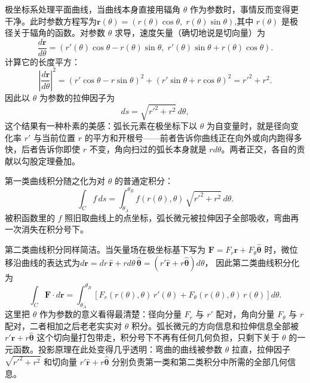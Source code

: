 \documentclass[UTF8]{ctexbook}
\begin{document}
极坐标系处理平面曲线，当曲线本身直接用辐角 $\theta$ 作为参数时，事情反而变得更干净。此时参数方程写为$\mathbf{r}(\theta) = (r(\theta)\cos\theta,\; r(\theta)\sin\theta)$,其中 $r(\theta)$ 是极径关于辐角的函数。对参数 $\theta$ 求导，速度矢量（确切地说是切向量）为
\[
\frac{d\mathbf{r}}{d\theta} = \left( r'(\theta)\cos\theta - r(\theta)\sin\theta,\; r'(\theta)\sin\theta + r(\theta)\cos\theta \right).
\]
计算它的长度平方：
\[
\left|\frac{d\mathbf{r}}{d\theta}\right|^2 = (r'\cos\theta - r\sin\theta)^2 + (r'\sin\theta + r\cos\theta)^2= r'^2 + r^2.
\]
因此以 $\theta$ 为参数的拉伸因子为
\[
ds = \sqrt{r'^2 + r^2} \, d\theta,
\]
这个结果有一种朴素的美感：弧长元素在极坐标下以 $\theta$ 为自变量时，就是径向变化率 $r'$ 与当前位置 $r$ 的平方和开根号——前者告诉你曲线正在向外或向内跑得多快，后者告诉你即使 $r$ 不变，角向扫过的弧长本身就是 $r d\theta$。两者正交，各自的贡献以勾股定理叠加。

第一类曲线积分随之化为对 $\theta$ 的普通定积分：
\[
\int_C f \, ds = \int_{\theta_A}^{\theta_B} f(r(\theta), \theta) \, \sqrt{r'^2 + r^2} \, d\theta.
\]
被积函数里的 $f$ 照旧取曲线上的点坐标，弧长微元被拉伸因子全部吸收，弯曲再一次消失在积分号下。

第二类曲线积分同样简洁。当矢量场在极坐标基下写为 $\mathbf{F} = F_r \hat{\mathbf{r}} + F_\theta \hat{\boldsymbol{\theta}}$ 时，微位移沿曲线的表达式为$d\mathbf{r} = dr \, \hat{\mathbf{r}} + r d\theta \, \hat{\boldsymbol{\theta}}
        = \left( r' \hat{\mathbf{r}} + r \hat{\boldsymbol{\theta}} \right) d\theta$，
因此第二类曲线积分化为
\[
\int_C \mathbf{F} \cdot d\mathbf{r} = \int_{\theta_A}^{\theta_B} \left[ F_r(r(\theta),\theta) \, r'(\theta) + F_\theta(r(\theta),\theta) \, r(\theta) \right] d\theta.
\]
这里把 $\theta$ 作为参数的意义看得最清楚：径向分量 $F_r$ 与 $r'$ 配对，角向分量 $F_\theta$ 与 $r$ 配对，二者相加之后老老实实对 $\theta$ 积分。弧长微元的方向信息和拉伸信息全部被 $r'\hat{\mathbf{r}} + r\hat{\boldsymbol{\theta}}$ 这个切向量打包带走，积分号下不再有任何几何负担，只剩下关于 $\theta$ 的一元函数。投影原理在此处变得几乎透明：弯曲的曲线被参数 $\theta$ 拉直，拉伸因子 $\sqrt{r'^2+r^2}$ 和切向量 $r'\hat{\mathbf{r}}+r\hat{\boldsymbol{\theta}}$ 分别负责第一类和第二类积分中所需的全部几何信息。
\end{document}
